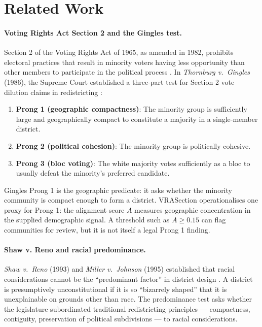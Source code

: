 \section{Related Work}
\label{sec:related}

\paragraph{Voting Rights Act Section 2 and the Gingles test.}
Section 2 of the Voting Rights Act of 1965, as amended in 1982,
prohibits electoral practices that result in minority voters having less
opportunity than other members to participate in the political process
\citep{vra1965}.
In \emph{Thornburg v.\ Gingles} (1986), the Supreme Court established
a three-part test for Section 2 vote dilution claims in redistricting
\citep{gingles1986}:

\begin{enumerate}
\item \textbf{Prong 1 (geographic compactness)}: The minority group is
  sufficiently large and geographically compact to constitute a majority
  in a single-member district.
\item \textbf{Prong 2 (political cohesion)}: The minority group is
  politically cohesive.
\item \textbf{Prong 3 (bloc voting)}: The white majority votes sufficiently
  as a bloc to usually defeat the minority's preferred candidate.
\end{enumerate}

Gingles Prong 1 is the geographic predicate: it asks whether the minority
community is compact enough to form a district.
VRASection operationalises one proxy for Prong 1: the alignment score $A$
measures geographic concentration in the supplied demographic signal.  A
threshold such as $A \geq 0.15$ can flag communities for review, but it is not
itself a legal Prong 1 finding.

\paragraph{Shaw v. Reno and racial predominance.}
\emph{Shaw v.\ Reno} (1993) and \emph{Miller v.\ Johnson} (1995)
established that racial considerations cannot be the ``predominant factor''
in district design \citep{shaw1993,miller1995}.
A district is presumptively unconstitutional if it is so ``bizarrely shaped''
that it is unexplainable on grounds other than race.
The predominance test asks whether the legislature subordinated traditional
redistricting principles --- compactness, contiguity, preservation of
political subdivisions --- to racial considerations.

